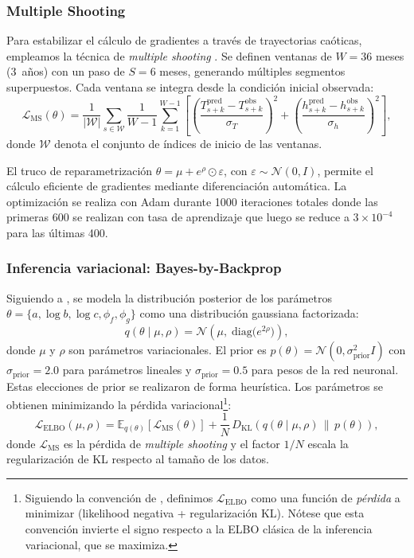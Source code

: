 \documentclass[11pt,a4paper]{article}
\newcommand{\E}{\mathbb{E}}
\newcommand{\KL}{\mathrm{KL}}
\newcommand{\ELBO}{\mathcal{L}_{\text{ELBO}}}
\begin{document}
\subsubsection{Multiple Shooting}
\label{sec:ms}

Para estabilizar el cálculo de gradientes a través de trayectorias caóticas, empleamos la técnica de \textit{multiple shooting} \citep{bock1984}. Se definen ventanas de $W = 36$ meses (3~años) con un paso de $S = 6$ meses, generando múltiples segmentos superpuestos. Cada ventana se integra desde la condición inicial observada:
\begin{equation}
\mathcal{L}_{\text{MS}}(\theta) = \frac{1}{|\mathcal{W}|} \sum_{s \in \mathcal{W}} \frac{1}{W-1} \sum_{k=1}^{W-1} \left[\left(\frac{T_{s+k}^{\text{pred}} - T_{s+k}^{\text{obs}}}{\sigma_T}\right)^{\!2} + \left(\frac{h_{s+k}^{\text{pred}} - h_{s+k}^{\text{obs}}}{\sigma_h}\right)^{\!2}\right],
\end{equation}
donde $\mathcal{W}$ denota el conjunto de índices de inicio de las ventanas.

El truco de reparametrización $\theta = \mu + e^\rho \odot \varepsilon$, con $\varepsilon \sim \mathcal{N}(0, I)$, permite el cálculo eficiente de gradientes mediante diferenciación automática. La optimización se realiza con Adam durante 1000 iteraciones totales donde las primeras 600 se realizan con tasa de aprendizaje que luego se reduce a $3\times 10^{-4}$ para las últimas 400.


\subsubsection{Inferencia variacional: Bayes-by-Backprop}
\label{sec:bbb}

Siguiendo a \citet{blundell2015}, se modela la distribución posterior de los parámetros $\theta = \{a, \log b, \log c, \phi_f, \phi_g\}$ como una distribución gaussiana factorizada:
\begin{equation}
q(\theta \mid \mu, \rho) = \mathcal{N}\!\left(\mu,\; \text{diag}\big(e^{2\rho}\big)\right),
\end{equation}
donde $\mu$ y $\rho$ son parámetros variacionales. El prior es $p(\theta) = \mathcal{N}(0, \sigma_{\text{prior}}^2 I)$ con $\sigma_{\text{prior}} = 2.0$ para parámetros lineales y $\sigma_{\text{prior}} = 0.5$ para pesos de la red neuronal. Estas elecciones de prior se realizaron de forma heurística. Los parámetros se obtienen minimizando la pérdida variacional\footnote{Siguiendo la convención de \citet{blundell2015}, definimos $\ELBO$ como una función de \textit{pérdida} a minimizar (likelihood negativa + regularización KL). Nótese que esta convención invierte el signo respecto a la ELBO clásica de la inferencia variacional, que se maximiza.}:
\begin{equation}
\label{eq:elbo}
\ELBO(\mu, \rho) = \E_{q(\theta)}\!\left[\mathcal{L}_{\text{MS}}(\theta)\right] + \frac{1}{N}\,D_{\KL}\!\left(q(\theta \mid \mu, \rho) \,\|\, p(\theta)\right),
\end{equation}
donde $\mathcal{L}_{\text{MS}}$ es la pérdida de \textit{multiple shooting} y el factor $1/N$ escala la regularización de KL respecto al tamaño de los datos.
\end{document}
